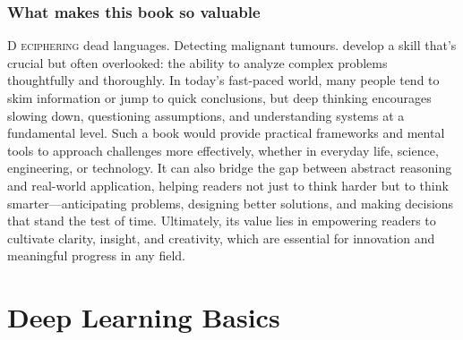 \documentclass{book}
\begin{document}
\subsection{What makes this book so valuable}
\lettrine{D}{ eciphering} dead languages. Detecting malignant tumours. develop a skill that’s crucial but often overlooked: the ability to analyze complex problems thoughtfully and thoroughly. In today’s fast-paced world, many people tend to skim information or jump to quick conclusions, but deep thinking encourages slowing down, questioning assumptions, and understanding systems at a fundamental level. Such a book would provide practical frameworks and mental tools to approach challenges more effectively, whether in everyday life, science, engineering, or technology. It can also bridge the gap between abstract reasoning and real-world application, helping readers not just to think harder but to think smarter—anticipating problems, designing better solutions, and making decisions that stand the test of time. Ultimately, its value lies in empowering readers to cultivate clarity, insight, and creativity, which are essential for innovation and meaningful progress in any field.

\chapter{Deep Learning Basics}
\end{document}
